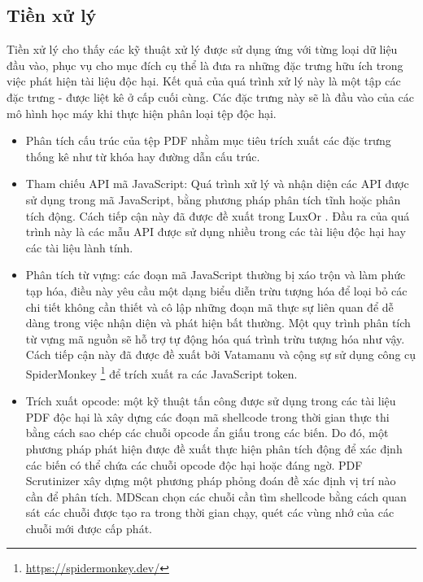 \documentclass[./../main.tex]{subfiles}
\begin{document}
\subsection*{Tiền xử lý}
Tiền xử lý cho thấy các kỹ thuật xử lý được sử dụng ứng với từng loại dữ liệu đầu vào, phục vụ cho mục đích cụ thể là đưa ra những đặc trưng hữu ích trong việc phát hiện tài liệu độc hại. Kết quả của quá trình xử lý này là một tập các đặc trưng - được liệt kê ở cấp cuối cùng. Các đặc trưng này sẽ là đầu vào của các mô hình học máy khi thực hiện phân loại tệp độc hại.

\begin{itemize}
	\item Phân tích cấu trúc của tệp PDF nhằm mục tiêu trích xuất các đặc trưng thống kê như từ khóa hay đường dẫn cấu trúc.
	\item Tham chiếu API mã JavaScript:  Quá trình xử lý và nhận diện các API được sử dụng trong mã JavaScript, bằng phương pháp phân tích tĩnh hoặc phân tích động. Cách tiếp cận này đã được đề xuất trong LuxOr \cite{luxor}. Đầu ra của quá trình này là các mẫu API được sử dụng nhiều trong các tài liệu độc hại hay các tài liệu lành tính.
	\item Phân tích từ vựng: các đoạn mã JavaScript thường bị xáo trộn và làm phức tạp hóa, điều này yêu cầu một dạng biểu diễn trừu tượng hóa để loại bỏ các chi tiết không cần thiết và cô lập những đoạn mã thực sự liên quan để dễ dàng trong việc nhận diện và phát hiện bất thường. Một quy trình phân tích từ vựng mã nguồn sẽ hỗ trợ tự động hóa quá trình trừu tượng hóa như vậy. Cách tiếp cận này đã được đề xuất bởi Vatamanu và cộng sự \cite{vatamanu} sử dụng công cụ SpiderMonkey \footnote{\url{https://spidermonkey.dev/}} để trích xuất ra các JavaScript token.
	\item Trích xuất opcode: một kỹ thuật tấn công được sử dụng trong các tài liệu PDF độc hại là xây dựng các đoạn mã shellcode trong thời gian thực thi bằng cách sao chép các chuỗi opcode ẩn giấu trong các biến. Do đó, một phương pháp phát hiện được đề xuất thực hiện phân tích động để xác định các biến có thể chứa các chuỗi opcode độc hại hoặc đáng ngờ. PDF Scrutinizer \cite{scrutinizer} xây dựng một phương pháp phỏng đoán đề xác định vị trí nào cần để phân tích. MDScan \cite{mdscan} chọn các chuỗi cần tìm shellcode bằng cách quan sát các chuỗi được tạo ra trong thời gian chạy, quét các vùng nhớ của các chuỗi mới được cấp phát.

\end{itemize}
\end{document}
